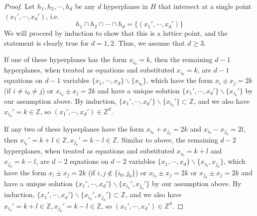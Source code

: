 \documentclass{article}
\numberwithin{equation}{section}
\theoremstyle{definition}
\begin{document}
\begin{proof}
Let $h_1,h_2,\cdots,h_d$ be any $d$ hyperplanes in $H$ that intersect at a single point $(x_1',\cdots,x_d')$, i.e.
$$h_1 \cap h_2 \cap \cdots \cap h_d = \{ (x_1',\cdots,x_d') \}$$
We will proceed by induction to show that this is a lattice point, and the statement is clearly true for $d=1,2$. Thus, we assume that $d\ge 3$.

If one of these hyperplanes has the form $x_{i_0}=k$, then the remaining $d-1$ hyperplanes, when treated as equations and substituted $x_{i_0}=k$, are $d-1$ equations on $d-1$ variables $\{x_1,\cdots,x_d\}\backslash\{x_{i_0}\}$, which have the form $x_i\pm x_j = 2k$ (if $i\ne i_0\ne j$) or $x_{i_0} \pm x_j = 2k$ and have a unique solution $\{x_1',\cdots,x_d'\}\backslash\{x_{i_0}'\}$ by our assumption above. By induction, $\{x_1',\cdots,x_d'\}\backslash\{x_{i_0}'\}\subset\mathbb{Z}$, and we also have $x_{i_0}'=k\in\mathbb{Z}$, so $(x_1',\cdots,x_d')\in\mathbb{Z}^d$.

If any two of these hyperplanes have the form $x_{i_0}+x_{j_0}=2k$ and $x_{i_0}-x_{j_0}=2l$, then $x_{i_0}'=k+l\in\mathbb{Z}, x_{j_0}'=k-l\in\mathbb{Z}$. Similar to above, the remaining $d-2$ hyperplanes, when treated as equations and substituted $x_{i_0}=k+l$ and $x_{j_0}=k-l$, are $d-2$ equations on $d-2$ variables $\{x_1,\cdots,x_d\}\backslash\{x_{i_0},x_{j_0}\}$, which have the form $x_i\pm x_j = 2k$ (if $i,j\notin\{i_0,j_0\}$) or $x_{i_0} \pm x_j = 2k$ or $x_{j_0} \pm x_j = 2k$ and have a unique solution $\{x_1',\cdots,x_d'\}\backslash\{x_{i_0}',x_{j_0}'\}$ by our assumption above. By induction, $\{x_1',\cdots,x_d'\}\backslash\{x_{i_0}',x_{j_0}'\} \subset\mathbb{Z}$, and we also have $x_{i_0}'=k+l\in\mathbb{Z}, x_{j_0}'=k-l\in\mathbb{Z}$, so $(x_1',\cdots,x_d')\in\mathbb{Z}^d$.



\end{proof}
\end{document}
